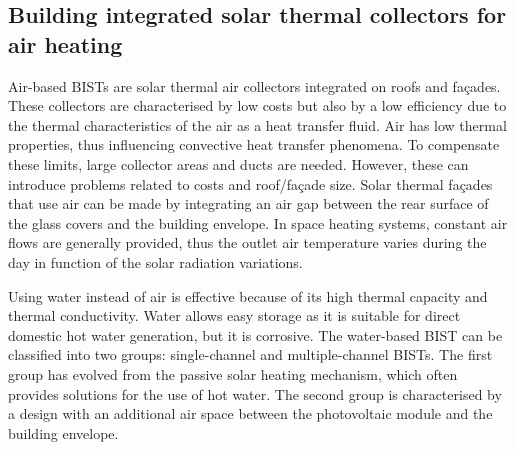 %
%
%
\subsection{Building integrated solar thermal collectors for air heating}

Air-based BISTs are solar thermal air collectors integrated on roofs and fa\c{c}ades. These collectors are characterised by low costs but also by a low efficiency due to the thermal characteristics of the air as a heat transfer fluid. Air has low thermal properties, thus influencing convective heat transfer phenomena. To compensate these limits, large collector areas and ducts are needed. However, these can introduce problems related to costs and roof/fa\c{c}ade size. Solar thermal fa\c{c}ades that use air can be made by integrating an air gap between the rear surface of the glass covers and the building envelope. In space heating systems, constant air flows are generally provided, thus the outlet air temperature varies during the day in function of the solar radiation variations.

Using water instead of air is effective because of its high thermal capacity and thermal conductivity. Water allows easy storage as it is suitable for direct domestic hot water generation, but it is corrosive. The water-based BIST can be classified into two groups: single-channel and multiple-channel BISTs. The first group has evolved from the passive solar heating mechanism, which often provides solutions for the use of hot water. The second group is characterised by a design with an additional air space between the photovoltaic module and the building envelope.

